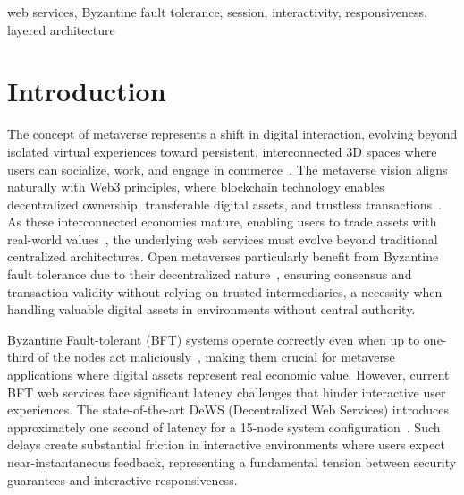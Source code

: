 \documentclass[conference]{IEEEtran}
\begin{document}
\begin{IEEEkeywords}
web services, Byzantine fault tolerance, session, interactivity, responsiveness, layered architecture
\end{IEEEkeywords}

\section{Introduction}
\label{sec:introduction}

The concept of metaverse represents a shift in digital interaction, evolving beyond isolated virtual experiences toward persistent, interconnected 3D spaces where users can socialize, work, and engage in commerce~\cite{encyclopedia2010031, rony_e-commerce_2024}. The metaverse vision aligns naturally with Web3 principles, where blockchain technology enables decentralized ownership, transferable digital assets, and trustless transactions~\cite{hatami_survey_2024}. As these interconnected economies mature, enabling users to trade assets with real-world values~\cite{yang_web30_2023}, the underlying web services must evolve beyond traditional centralized architectures. Open metaverses particularly benefit from Byzantine fault tolerance due to their decentralized nature~\cite{rajawat_enhancing_2023}, ensuring consensus and transaction validity without relying on trusted intermediaries, a necessity when handling valuable digital assets in environments without central authority.

Byzantine Fault-tolerant (BFT) systems operate correctly even when up to one-third of the nodes act maliciously~\cite{lamport_byzantine_1982, castro_practical_2002}, making them crucial for metaverse applications where digital assets represent real economic value. However, current BFT web services face significant latency challenges that hinder interactive user experiences. The state-of-the-art DeWS (Decentralized Web Services) introduces approximately one second of latency for a 15-node system configuration~\cite{ramachandran_dews_2023}. Such delays create substantial friction in interactive environments where users expect near-instantaneous feedback, representing a fundamental tension between security guarantees and interactive responsiveness.
\end{document}
